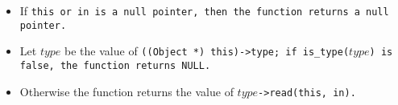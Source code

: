\begin{itemize}[nosep]

\item If \tt{this} or \tt{in} is a null pointer,
then the function returns a null pointer.

\item Let $type$ be the value of \tt{((Object *) this)->type}; if
\tt{is_type(}$type$\tt{)} is \tt{false}, the function returns \tt{NULL}.

\item Otherwise the function returns the value of $type$\tt{->read(this, in)}.

\end{itemize}
